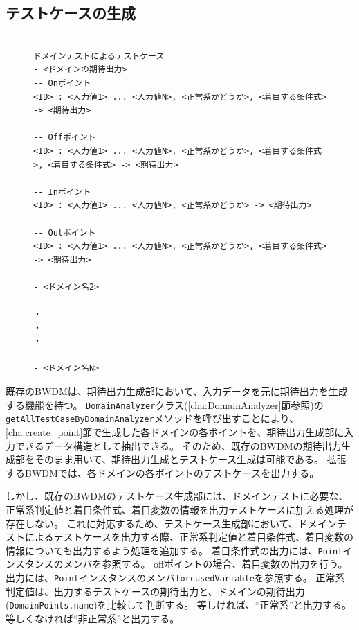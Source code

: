 \documentclass[uplatex, report, a4j, 10pt]{jsbook}
\newcommand\ttt[1]{\texttt{#1}}
\begin{document}
\subsection{テストケースの生成}
\lstset{language=}
\begin{figure}[tp]
  \begin{lstlisting}[caption=ドメイン分析テストのためのテストケースの出力フォーマット,label=fig:dmin_output_format]

ドメインテストによるテストケース
- <ドメインの期待出力>
-- Onポイント
<ID> : <入力値1> ... <入力値N>, <正常系かどうか>, <着目する条件式> -> <期待出力>

-- Offポイント
<ID> : <入力値1> ... <入力値N>, <正常系かどうか>, <着目する条件式>, <着目する条件式> -> <期待出力>

-- Inポイント
<ID> : <入力値1> ... <入力値N>, <正常系かどうか> -> <期待出力>

-- Outポイント
<ID> : <入力値1> ... <入力値N>, <正常系かどうか>, <着目する条件式> -> <期待出力>

- <ドメイン名2>

・
・
・

- <ドメイン名N>

\end{lstlisting}
\end{figure}

既存のBWDMは、期待出力生成部において、入力データを元に期待出力を生成する機能を持つ。
\ttt{DomainAnalyzer}クラス(\ref{cha:DomainAnalyzer}節参照)の\ttt{getAllTestCaseByDomainAnalyzer}メソッドを呼び出すことにより、\ref{cha:create_point}節で生成した各ドメインの各ポイントを、期待出力生成部に入力できるデータ構造として抽出できる。
そのため、既存のBWDMの期待出力生成部をそのまま用いて、期待出力生成とテストケース生成は可能である。
拡張するBWDMでは、各ドメインの各ポイントのテストケースを出力する。

しかし、既存のBWDMのテストケース生成部には、ドメインテストに必要な、正常系判定値と着目条件式、着目変数の情報を出力テストケースに加える処理が存在しない。
これに対応するため、テストケース生成部において、ドメインテストによるテストケースを出力する際、正常系判定値と着目条件式、着目変数の情報についても出力するよう処理を追加する。
着目条件式の出力には、\ttt{Point}インスタンスのメンバ\forcusedConditionalExpression{}を参照する。
offポイントの場合、着目変数の出力を行う。出力には、\ttt{Point}インスタンスのメンバ\ttt{forcusedVariable}を参照する。
正常系判定値は、出力するテストケースの期待出力と、ドメインの期待出力(\ttt{DomainPoints.name})を比較して判断する。
等しければ、“正常系”と出力する。等しくなければ“非正常系”と出力する。
\end{document}
